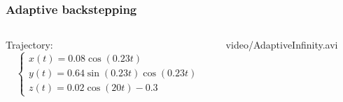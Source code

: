 %
\begin{frame}
\frametitle{Adaptive backstepping}
%
\begin{columns}
\begin{column}{0.4\textwidth}
	Trajectory:
	\begin{equation*}
		\begin{cases}
		x(t)=0.08\cos{(0.23t)}\\
		y(t)=0.64\sin{(0.23t)}\cos{(0.23t)}\\
		z(t)=0.02\cos{(20t)}-0.3
		\end{cases}
	\end{equation*}
\end{column}
\begin{column}{0.6\textwidth}
	\begin{center}
		{video/AdaptiveInfinity.avi}
	\end{center}
\end{column}
\end{columns}
\end{frame}
%

